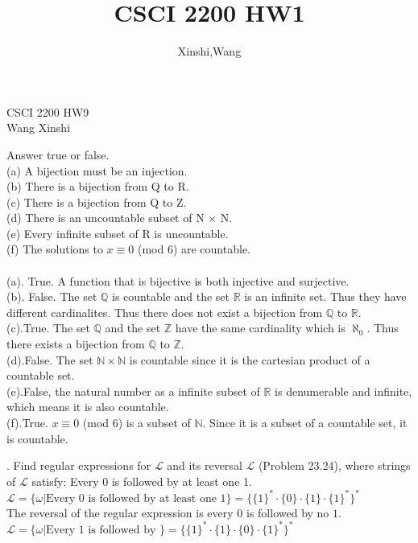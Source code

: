 \documentclass{article}
\title{CSCI 2200 HW1}
\author{Xinshi,Wang}
\begin{document}
\noindent
CSCI 2200 HW9\\
Wang Xinshi\\

\begin{addmargin}[2em]{2em}
	 Answer true or false.\\
	(a) A bijection must be an injection.\\
	(b) There is a bijection from Q to R.\\
	(c) There is a bijection from Q to Z.\\
	(d) There is an uncountable subset of N × N.\\
	(e) Every infinite subset of R is uncountable.\\
	(f) The solutions to $x \equiv 0$ (mod 6) are countable.\\\\
	(a). True. A function that is bijective is both injective and surjective.\\
	(b). False. The set $\mathbb{Q}$ is countable and the set $\mathbb{R}$ is an infinite set. Thus they have different cardinalites. Thus there does not exist a bijection from $\mathbb{Q}$ to $\mathbb{R}$.\\
	(c).True. The set $\mathbb{Q}$ and the set $\mathbb{Z}$ have the same cardinality which is $\aleph_0$. Thus there exists a bijection from $\mathbb{Q}$ to $\mathbb{Z}$.\\
	(d).False. The set $\mathbb{N} \times \mathbb{N}$ is countable since it is the cartesian product of a countable set.\\
	(e).False, the natural number as a infinite subset of $\mathbb{R}$ is denumerable and infinite, which means it is also countable.\\
	(f).True.  $x \equiv 0$ (mod 6) is a subset of $\mathbb{N}$. Since it is a subset of a countable set, it is countable.
\end{addmargin}
\clearpage


\begin{addmargin}[2em]{2em}
	. Find regular expressions for $\mathcal{L}$ and its reversal $\mathcal{L}$ (Problem 23.24), where strings of $\mathcal{L}$ satisfy: Every 0 is followed by at least one 1.\\
	$\mathcal{L} = \{\omega|\text{Every 0 is followed by at least one 1}\} = \{\{1\}^* \cdot \{0\} \cdot \{1\} \cdot \{1\}^* \}^*$\\
	The reversal of the regular expression is every $0$ is followed by no $1$.\\
	$\mathcal{L} = \{\omega|\text{Every 1 is followed by }\} =  \{\{1\}^* \cdot \{1\} \cdot \{0\} \cdot \{1\}^* \}^* $\\
\end{addmargin}
\end{document}
